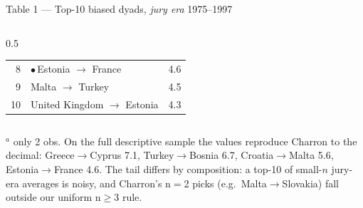 \documentclass[aspectratio=169,10pt]{beamer}
\newcommand{\paper}[1]{{\color{papercol}#1}}
\newcommand{\rep}[1]{{\color{repcol}#1}}
\newcommand{\hit}{{\color{papercol!55!repcol}$\bullet$}}
\begin{document}
\begin{frame}{Table 1 --- Top-10 biased dyads, \emph{jury era} 1975--1997}
\begin{columns}[T]
\begin{column}{0.5\textwidth}
\begin{tabular}{@{}r l r@{}}
        8 & \hit\,Estonia $\to$ France & 4.6\\
        9 & Malta $\to$ Turkey & 4.5\\
        10 & United Kingdom $\to$ Estonia & 4.3\\
        \bottomrule
      \end{tabular}
    \end{column}
  \end{columns}
  \vspace{4pt}
  {\scriptsize \paper{$^a$ only 2 obs.} On the full descriptive sample the values
  reproduce Charron to the decimal: Greece$\to$Cyprus \rep{7.1}, Turkey$\to$Bosnia
  \rep{6.7}, Croatia$\to$Malta \rep{5.6}, Estonia$\to$France \rep{4.6}. The tail differs
  by composition: a top-10 of small-$n$ jury-era averages is noisy, and Charron's
  n$=$2 picks (e.g.\ Malta$\to$Slovakia) fall outside our uniform n$\geq$3 rule.}
\end{frame}
\end{document}
